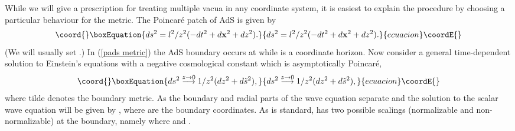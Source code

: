 \documentclass[a4paper,aps,prd,preprintnumbers,groupedaddress]{revtex4}
\begin{document}
While we will give a prescription for treating multiple vacua in any coordinate system, it is easiest to explain the procedure by choosing a particular behaviour for the metric.   The Poincar\'{e} patch of AdS\coordHE{} is  given by
\begin{equation}\coord{}\boxEquation{
\label{pads metric} ds^2 = l^2/z^2 (-dt^2 +d {\bf x} ^2 + dz^2).
}{
ds^2 = l^2/z^2 (-dt^2 +d {\bf x} ^2 + dz^2).
}{ecuacion}\coordE{}\end{equation}
(We will usually set \coordHE{}.)   In (\ref{pads metric}) the AdS boundary occurs at \coordHE{} while \coordHE{} is a coordinate horizon.   Now consider a general time-dependent solution to Einstein's equations with a negative cosmological constant which is asymptotically Poincar\'{e},
\begin{equation}\coord{}\boxEquation{
\label{modified pads metric} ds^2 \stackrel{z \rightarrow 0}{\longrightarrow}1/z^2 (dz^2 +d\tilde{s} ^2),
}{
ds^2 \stackrel{z \rightarrow 0}{\longrightarrow}1/z^2 (dz^2 +d\tilde{s} ^2),
}{ecuacion}\coordE{}\end{equation}
where tilde denotes the boundary metric.   As \coordHE{} the boundary and radial parts of the wave equation separate and the solution to the scalar wave equation will be given by \coordHE{}, where \coordHE{} are the boundary coordinates.   As is standard, \coordHE{} has
two possible scalings (normalizable  and non-normalizable) at the boundary, namely \coordHE{} where \coordHE{} and \coordHE{} \cite{vijay981}.
\end{document}
